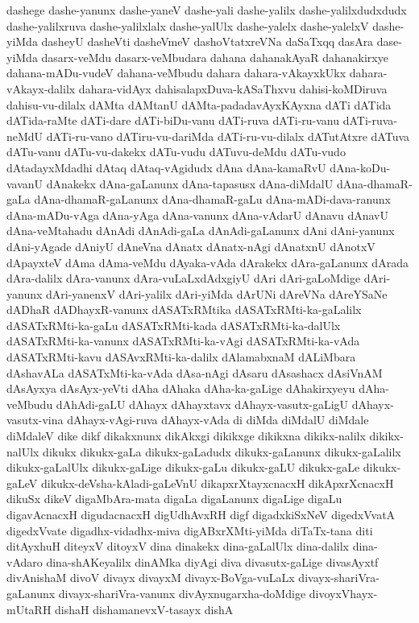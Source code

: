 {dashege
dashe-yanunx
dashe-yaneV
dashe-yali
dashe-yalilx
dashe-yalilxdudxdudx
dashe-yalilxruva
dashe-yalilxlalx
dashe-yalUlx
dashe-yalelx
dashe-yalelxV
dashe-yiMda
dasheyU
dasheVti
dasheVmeV
dashoVtatxreVNa
daSaTxqq
dasAra
dase-yiMda
dasarx-veMdu
dasarx-veMbudara
dahana
dahanakAyaR
dahanakirxye
dahana-mADu-vudeV
dahana-veMbudu
dahara
dahara-vAkayxkUkx
dahara-vAkayx-dalilx
dahara-vidAyx
dahisalapxDuva-kASaThxvu
dahisi-koMDiruva
dahisu-vu-dilalx
dAMta
dAMtanU
dAMta-padadavAyxKAyxna
dATi
dATida
dATida-raMte
dATi-dare
dATi-biDu-vanu
dATi-ruva
dATi-ru-vanu
dATi-ruva-neMdU
dATi-ru-vano
dATiru-vu-dariMda
dATi-ru-vu-dilalx
dATutAtxre
dATuva
dATu-vanu
dATu-vu-dakekx
dATu-vudu
dATuvu-deMdu
dATu-vudo
dAtadayxMdadhi
dAtaq
dAtaq-vAgidudx
dAna
dAna-kamaRvU
dAna-koDu-vavanU
dAnakekx
dAna-gaLanunx
dAna-tapasusx
dAna-diMdalU
dAna-dhamaR-gaLa
dAna-dhamaR-gaLanunx
dAna-dhamaR-gaLu
dAna-mADi-dava-ranunx
dAna-mADu-vAga
dAna-yAga
dAna-vanunx
dAna-vAdarU
dAnavu
dAnavU
dAna-veMtahadu
dAnAdi
dAnAdi-gaLa
dAnAdi-gaLanunx
dAni
dAni-yanunx
dAni-yAgade
dAniyU
dAneVna
dAnatx
dAnatx-nAgi
dAnatxnU
dAnotxV
dApayxteV
dAma
dAma-veMdu
dAyaka-vAda
dArakekx
dAra-gaLanunx
dArada
dAra-dalilx
dAra-vanunx
dAra-vuLaLxdAdxgiyU
dAri
dAri-gaLoMdige
dAri-yanunx
dAri-yanenxV
dAri-yalilx
dAri-yiMda
dArUNi
dAreVNa
dAreYSaNe
dADhaR
dADhayxR-vanunx
dASATxRMtika
dASATxRMti-ka-gaLalilx
dASATxRMti-ka-gaLu
dASATxRMti-kada
dASATxRMti-ka-dalUlx
dASATxRMti-ka-vanunx
dASATxRMti-ka-vAgi
dASATxRMti-ka-vAda
dASATxRMti-kavu
dASAvxRMti-ka-dalilx
dAlamabxnaM
dALiMbara
dAshavALa
dASATxMti-ka-vAda
dAsa-nAgi
dAsaru
dAsashacx
dAsiVnAM
dAsAyxya
dAsAyx-yeVti
dAha
dAhaka
dAha-ka-gaLige
dAhakirxyeyu
dAha-veMbudu
dAhAdi-gaLU
dAhayx
dAhayxtavx
dAhayx-vasutx-gaLigU
dAhayx-vasutx-vina
dAhayx-vAgi-ruva
dAhayx-vAda
di
diMda
diMdalU
diMdale
diMdaleV
dike
dikf
dikakxnunx
dikAkxgi
dikikxge
dikikxna
dikikx-nalilx
dikikx-nalUlx
dikukx
dikukx-gaLa
dikukx-gaLadudx
dikukx-gaLanunx
dikukx-gaLalilx
dikukx-gaLalUlx
dikukx-gaLige
dikukx-gaLu
dikukx-gaLU
dikukx-gaLe
dikukx-gaLeV
dikukx-deVsha-kAladi-gaLeVnU
dikapxrXtayxcnacxH
dikApxrXcnacxH
dikuSx
dikeV
digaMbAra-mata
digaLa
digaLanunx
digaLige
digaLu
digavAcnacxH
digudacnacxH
digUdhAvxRH
digf
digadxkiSxNeV
digedxVvatA
digedxVvate
digadhx-vidadhx-miva
digABxrXMti-yiMda
diTaTx-tana
diti
ditAyxhuH
diteyxV
ditoyxV
dina
dinakekx
dina-gaLalUlx
dina-dalilx
dina-vAdaro
dina-shAKeyalilx
dinAMka
diyAgi
diva
divasutx-gaLige
divasAyxtf
divAnishaM
divoV
divayx
divayxM
divayx-BoVga-vuLaLx
divayx-shariVra-gaLanunx
divayx-shariVra-vanunx
divAyxnugarxha-doMdige
divoyxVhayx-mUtaRH
dishaH
dishamanevxV-tasayx
dishA
}
